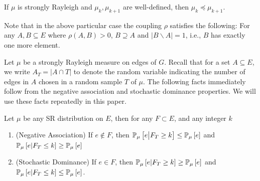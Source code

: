 \begin{theorem}
\label{thm:stochDom}
	If $\mu$ is strongly Rayleigh and $\mu_k,\mu_{k+1}$ are well-defined, then $\mu_k \preceq \mu_{k+1}$.
\end{theorem}
Note that in the above particular case the coupling $\rho$ satisfies the following: For any $A,B\subseteq E$ where $\rho(A,B)>0$, $B\supseteq A$ and $|B\smallsetminus A|=1$, i.e., $B$ has exactly one more element.


Let $\mu$ be a strongly Rayleigh measure on edges of $G$. Recall that for a set $A\subseteq E$, we write $A_T=|A\cap T|$ to denote the random variable indicating the number of edges in $A$ chosen in a random sample $T$ of $\mu$. The following facts immediately follow from the negative association and stochastic dominance properties. We will use these facts repeatedly in this paper. 

\begin{fact}
\label{fact:updown}
Let $\mu$ be any SR distribution on $E$, then
for any $F\subset E$, and any integer $k$
\begin{enumerate}
\item (Negative Association) If $e\notin F$, then ${\mathbb{P}}_{\mu}\left[e \big| F_T \geq k\right] \leq {\mathbb{P}}_{\mu}\left[e\right]$ and 
${\mathbb{P}}_{\mu}\left[e | F_T \leq k\right] \geq {\mathbb{P}}_{\mu}\left[e\right] $
\item (Stochastic Dominance) If $e\in F$, then ${\mathbb{P}}_{\mu}\left[e | F_T \geq k\right] \geq {\mathbb{P}}_{\mu}\left[e\right]$ and ${\mathbb{P}}_{\mu}\left[e | F_T\leq k\right] \leq {\mathbb{P}}_{\mu}\left[e\right]$.
\end{enumerate}
\end{fact}

